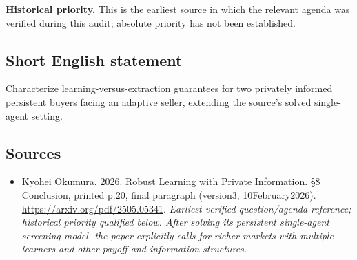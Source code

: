 \documentclass[11pt]{article}
\begin{document}
\par\textbf{Historical priority.} This is the earliest source in which the relevant agenda was verified during this audit; absolute priority has not been established.

\subsection{Short English statement}
Characterize learning-versus-extraction guarantees for two privately informed persistent buyers facing an adaptive seller, extending the source’s solved single-agent setting.

\subsection{Sources}
\begin{itemize}\raggedright
\item[\textnormal{[S1]}]\hypertarget{source:30007569:1}{} Kyohei Okumura. 2026. Robust Learning with Private Information. §8 Conclusion, printed p.20, final paragraph (version3, 10February2026).
\url{https://arxiv.org/pdf/2505.05341}.
{\small\textit{Earliest verified question/agenda reference; historical priority qualified below. After solving its persistent single-agent screening model, the paper explicitly calls for richer markets with multiple learners and other payoff and information structures.}}
\end{itemize}
\end{document}
